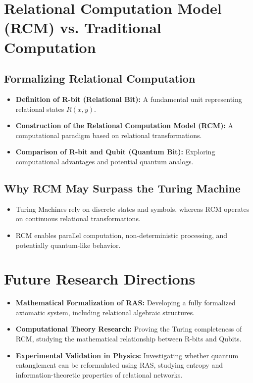 \documentclass[a4paper,12pt]{article}
\begin{document}
\section{Relational Computation Model (RCM) vs. Traditional Computation}
\subsection{Formalizing Relational Computation}
\begin{itemize}
    \item \textbf{Definition of R-bit (Relational Bit):} A fundamental unit representing relational states \( R(x, y) \).
    \item \textbf{Construction of the Relational Computation Model (RCM):} A computational paradigm based on relational transformations.
    \item \textbf{Comparison of R-bit and Qubit (Quantum Bit):} Exploring computational advantages and potential quantum analogs.
\end{itemize}

\subsection{Why RCM May Surpass the Turing Machine}
\begin{itemize}
    \item Turing Machines rely on discrete states and symbols, whereas RCM operates on continuous relational transformations.
    \item RCM enables parallel computation, non-deterministic processing, and potentially quantum-like behavior.
\end{itemize}

\section{Future Research Directions}
\begin{itemize}
    \item \textbf{Mathematical Formalization of RAS:} Developing a fully formalized axiomatic system, including relational algebraic structures.
    \item \textbf{Computational Theory Research:} Proving the Turing completeness of RCM, studying the mathematical relationship between R-bits and Qubits.
    \item \textbf{Experimental Validation in Physics:} Investigating whether quantum entanglement can be reformulated using RAS, studying entropy and information-theoretic properties of relational networks.
\end{itemize}
\end{document}

